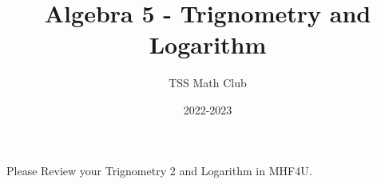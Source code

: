 \documentclass{article}
\title{Algebra 5 - Trignometry and Logarithm }
\author{TSS Math Club}
\date{2022-2023}
\begin{document}
\large

\maketitle

\center

Please Review your Trignometry 2 and Logarithm in MHF4U.
\end{document}
